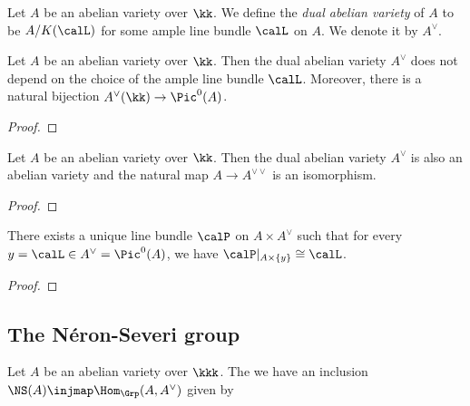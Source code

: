     \begin{definition}\label{def:dual_abelian_variety}
        Let \(A\) be an abelian variety over \(\kk\).
        We define the \emph{dual abelian variety} of \(A\) to be \(A/K(\calL)\) for some ample line bundle \(\calL\) on \(A\).
        We denote it by \(A^\vee\).
    \end{definition}

    \begin{theorem}\label{thm:dual_abelian_variety_as_Pic0}
        Let $A$ be an abelian variety over $\kk$. 
        Then the dual abelian variety \(A^\vee\) does not depend on the choice of the ample line bundle \(\calL\).
        Moreover, there is a natural bijection \(A^\vee(\kk) \to \Pic^0(A)\).
    \end{theorem}
    \begin{proof}
    \end{proof}

    \begin{proposition}\label{prop:dual_of_dual_is_A}
        Let \(A\) be an abelian variety over \(\kk\).
        Then the dual abelian variety \(A^\vee\) is also an abelian variety and the natural map \(A \to A^{\vee\vee}\) is an isomorphism.
    \end{proposition}
    \begin{proof}
    \end{proof}

    \begin{proposition}\label{prop: the Poincare line bundle}
        There exists a unique line bundle \(\calP\) on \(A \times A^\vee\) such that for every \(y = \calL \in A^\vee = \Pic^0(A)\), we have \(\calP|_{A \times \{y\}} \cong \calL\).
    \end{proposition}
    \begin{proof}
    \end{proof}


\subsection{The N\'eron-Severi group}


    \begin{theorem}\label{thm:NS_A_as_homomorphisms_from_A_to_A_dual}
        Let \(A\) be an abelian variety over \(\kkk\).
        The we have an inclusion \(\NS(A) \injmap \Hom_{\Grp}(A, A^\vee)\) given by 
    \end{theorem}
